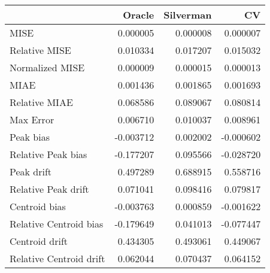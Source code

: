 \begin{tabular}{lrrr}
  \hline
 & Oracle & Silverman & CV \\ 
  \hline
MISE & 0.000005 & 0.000008 & 0.000007 \\ 
  Relative MISE & 0.010334 & 0.017207 & 0.015032 \\ 
  Normalized MISE & 0.000009 & 0.000015 & 0.000013 \\ 
  MIAE & 0.001436 & 0.001865 & 0.001693 \\ 
  Relative MIAE & 0.068586 & 0.089067 & 0.080814 \\ 
  Max Error & 0.006710 & 0.010037 & 0.008961 \\ 
  Peak bias & -0.003712 & 0.002002 & -0.000602 \\ 
  Relative Peak bias & -0.177207 & 0.095566 & -0.028720 \\ 
  Peak drift & 0.497289 & 0.688915 & 0.558716 \\ 
  Relative Peak drift & 0.071041 & 0.098416 & 0.079817 \\ 
  Centroid bias & -0.003763 & 0.000859 & -0.001622 \\ 
  Relative Centroid bias & -0.179649 & 0.041013 & -0.077447 \\ 
  Centroid drift & 0.434305 & 0.493061 & 0.449067 \\ 
  Relative Centroid drift & 0.062044 & 0.070437 & 0.064152 \\ 
   \hline
\end{tabular}
